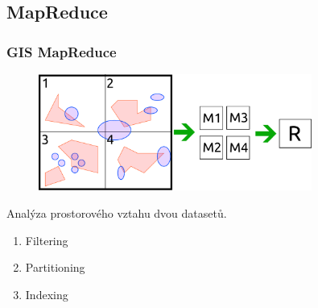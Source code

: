 \documentclass[unicode,bookmarksnumbered]{beamer}
\begin{document}
	\subsection{MapReduce}
	\begin{frame}
	\frametitle{GIS MapReduce}
		\begin{figure}
			\centering
			\includegraphics[width=0.8\textwidth]{./img/spatial/mapred_spatial.pdf}
		\end{figure}
		Analýza prostorového vztahu dvou datasetů.
		
		\begin{enumerate}
			\item Filtering 
			\item Partitioning
			\item Indexing
		\end{enumerate}
	\end{frame}
%


	
\end{document}

